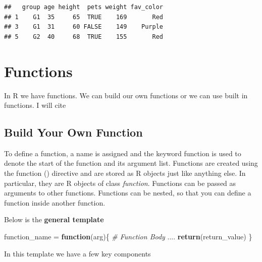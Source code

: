 \documentclass[
]{book}
\newenvironment{Shaded}{\begin{snugshade}}{\end{snugshade}}
\newcommand{\CommentTok}[1]{\textcolor[rgb]{0.56,0.35,0.01}{\textit{#1}}}
\newcommand{\ControlFlowTok}[1]{\textcolor[rgb]{0.13,0.29,0.53}{\textbf{#1}}}
\newcommand{\KeywordTok}[1]{\textcolor[rgb]{0.13,0.29,0.53}{\textbf{#1}}}
\newcommand{\NormalTok}[1]{#1}
\newcommand{\StringTok}[1]{\textcolor[rgb]{0.31,0.60,0.02}{#1}}
\begin{document}
\begin{verbatim}
##   group age height  pets weight fav_color
## 1    G1  35     65  TRUE    169       Red
## 3    G1  31     60 FALSE    149    Purple
## 5    G2  40     68  TRUE    155       Red
\end{verbatim}

\hypertarget{functions}{%
\chapter{Functions}\label{functions}}

In R we have functions. We can build our own functions or we can use built in functions. I will cite \citet{r-func} \citet{dummies2015}

\hypertarget{build-your-own-function}{%
\section{Build Your Own Function}\label{build-your-own-function}}

To define a function, a name is assigned and the keyword function is used to denote the start of the function and its argument list. Functions are created using the function () directive and are stored as R objects just like anything else. In particular, they are R objects of class \emph{function}. Functions can be passed as arguments to other functions. Functions can be nested, so that you can define a function inside another function.

Below is the \textbf{general template}

\begin{Shaded}
\begin{Highlighting}[]
\NormalTok{function_name =}\StringTok{ }\ControlFlowTok{function}\NormalTok{(arg)\{}
  \CommentTok{# Function Body }
\NormalTok{  ....}
  \KeywordTok{return}\NormalTok{(return_value)}
\NormalTok{\}}
\end{Highlighting}
\end{Shaded}

In this template we have a few key components
\end{document}
